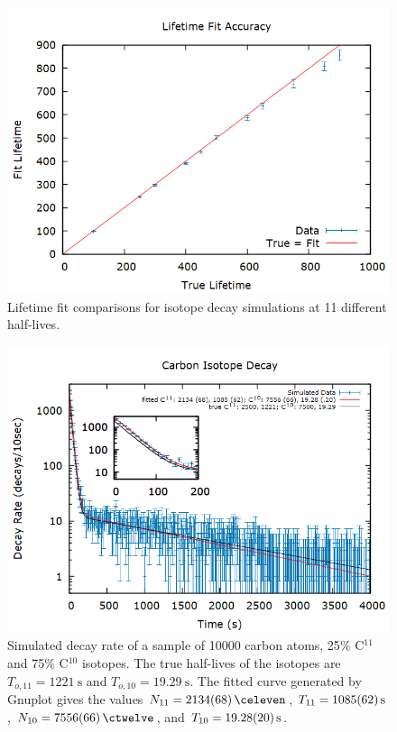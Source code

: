 \documentclass[aps,prl,twocolumn,superscriptaddress]{revtex4-1}
\begin{document}
\begin{figure}[htbp]
  	\begin{center}
 		\includegraphics[scale=0.3]{ltf.png}
  		\caption{Lifetime fit comparisons for isotope decay simulations at 11 different half-lives.}
  		\label{gr:ltf}
 	\end{center}
\end{figure}

\begin{figure}[htbp]
  	\begin{center}
 		\includegraphics[scale=0.3]{isoC2.png}
  		\caption{Simulated decay rate of a sample of 10000 carbon atoms, 25$\%$ C$^{11}$ and 75$\%$ C$^{10}$ isotopes. The true half-lives of the isotopes are $T_{o, 11} = \SI{1221}{\s}$ and $T_{o, 10} = \SI{19.29}{\s}$. The fitted curve generated by Gnuplot gives the values $N_{11} = \SI{2134 \pm 68}{\celeven}$, $T_{11} = \SI{1085 \pm 62}{\s}$, $N_{10} = \SI{7556 \pm 66}{\ctwelve}$, and $T_{10} = \SI{19.28 \pm .20}{\s}$.}
  		\label{gr:carbon}
 	\end{center}
\end{figure}
\end{document}
